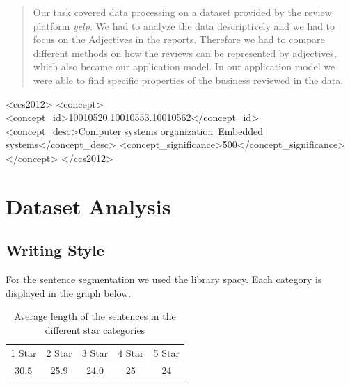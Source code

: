 \documentclass[sigchi]{acmart}
\begin{document}
	\begin{abstract}
		Our task covered data processing on a dataset provided by the review platform \textit{yelp}. We had to analyze the data
		descriptively and we had to focus on the Adjectives in the reports. Therefore we had to compare different methods on how the reviews can be represented by adjectives, which also became our application model. In our application model we were able to find specific properties of the business reviewed in the data.
	\end{abstract}
	
	\begin{CCSXML}
		<ccs2012>
		<concept>
		<concept_id>10010520.10010553.10010562</concept_id>
		<concept_desc>Computer systems organization~Embedded systems</concept_desc>
		<concept_significance>500</concept_significance>
		</concept>
		</ccs2012>
	\end{CCSXML}
	

	
	
	
	\maketitle
	
	\section{Dataset Analysis}
	\subsection{Writing Style}
	For the sentence segmentation we used the library spacy. Each category is displayed in the graph below.
	\begin{center}
		\begin{table}[!h]
			\caption{Average length of the sentences in the different star categories}
			\begin{tabular}{ c c c c c}
				1 Star & 2 Star & 3 Star  & 4 Star & 5 Star\\
				30.5 & 25.9 & 24.0  & 25 & 24\\
			\end{tabular}
		\end{table}
	\end{center}
	
\end{document}
